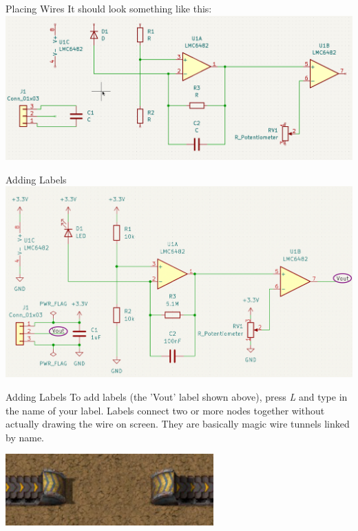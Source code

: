 \documentclass{beamer}
\begin{document}
\begin{frame}{Placing Wires}
  It should look something like this:
  \includegraphics[width=\textwidth]{images/schematic-wires.png}
\end{frame}

\begin{frame}{Adding Labels}
  \includegraphics[width=\textwidth]{images/schematic-labels.png}
\end{frame}

\begin{frame}{Adding Labels}
  To add labels (the 'Vout' label shown above), press \textit{L} and type in the
  name of your label. Labels connect two or more nodes together without
  actually drawing the wire on screen. They are basically magic wire tunnels
  linked by name.

  \centering
  \includegraphics[width=0.6\textwidth]{images/underground-belt.png}
\end{frame}
\end{document}

